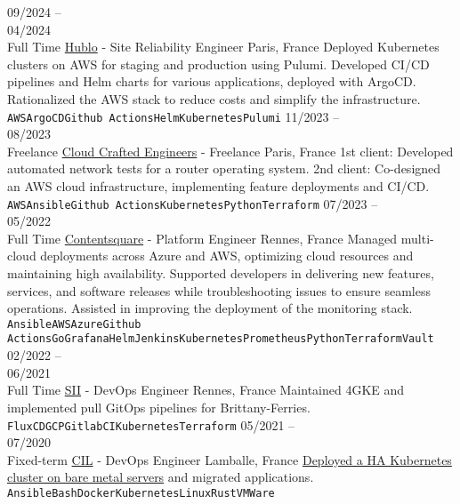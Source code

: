 \documentclass[10pt]{developercv}
\begin{document}
\begin{entrylist}
	\entry
		{09/2024 --\\04/2024\\\footnotesize{Full Time}}
		{\href{https://www.hublo.com/}{Hublo} - Site Reliability Engineer}
		{Paris, France}
		{Deployed Kubernetes clusters on AWS for staging and production using Pulumi.
		Developed CI/CD pipelines and Helm charts for various applications, deployed with ArgoCD.
		Rationalized the AWS stack to reduce costs and simplify the infrastructure.\\
		\texttt{AWS}\slashsep\texttt{ArgoCD}\slashsep\texttt{Github Actions}\slashsep\texttt{Helm}\slashsep\texttt{Kubernetes}\slashsep\texttt{Pulumi}}
	\entry
		{11/2023 --\\08/2023\\\footnotesize{Freelance}}
		{\href{https://craftedengineers.cloud/}{Cloud Crafted Engineers} - Freelance}
		{Paris, France}
		{1st client: Developed automated network tests for a router operating system.
		2nd client: Co-designed an AWS cloud infrastructure, implementing feature deployments and CI/CD.\\
		\texttt{AWS}\slashsep\texttt{Ansible}\slashsep\texttt{Github Actions}\slashsep\texttt{Kubernetes}\slashsep\texttt{Python}\slashsep\texttt{Terraform}}
	\entry
		{07/2023 --\\05/2022\\\footnotesize{Full Time}}
		{\href{https://contentsquare.com/}{Contentsquare} - Platform Engineer}
		{Rennes, France}
		{Managed multi-cloud deployments across Azure and AWS, optimizing cloud resources and maintaining high availability.
		Supported developers in delivering new features, services, and software releases while troubleshooting issues to ensure seamless operations.
		Assisted in improving the deployment of the monitoring stack.\\
		\texttt{Ansible}\slashsep\texttt{AWS}\slashsep\texttt{Azure}\slashsep\texttt{Github Actions}\slashsep\texttt{Go}\slashsep\texttt{Grafana}\slashsep\texttt{Helm}\slashsep\texttt{Jenkins}\slashsep\texttt{Kubernetes}\slashsep\texttt{Prometheus}\slashsep\texttt{Python}\slashsep\texttt{Terraform}\slashsep\texttt{Vault}}
	\entry
		{02/2022 --\\06/2021\\\footnotesize{Full Time}}
		{\href{https://sii-group.com/}{SII} - DevOps Engineer}
		{Rennes, France}
		{Maintained 4GKE and implemented pull GitOps pipelines for Brittany-Ferries.\\
		\texttt{FluxCD}\slashsep\texttt{GCP}\slashsep\texttt{GitlabCI}\slashsep\texttt{Kubernetes}\slashsep\texttt{Terraform}}
	\entry
		{05/2021 --\\07/2020\\\footnotesize{Fixed-term}}
		{\href{https://www.cil-lamballe.com/}{CIL} - DevOps Engineer}
		{Lamballe, France}
		{\href{https://github.com/Ant0wan/VMWare-Kubenetes-cluster}{Deployed a HA Kubernetes cluster on bare metal servers} and migrated applications.\\
		\texttt{Ansible}\slashsep\texttt{Bash}\slashsep\texttt{Docker}\slashsep\texttt{Kubernetes}\slashsep\texttt{Linux}\slashsep\texttt{Rust}\slashsep\texttt{VMWare}}
\end{entrylist}
\end{document}
